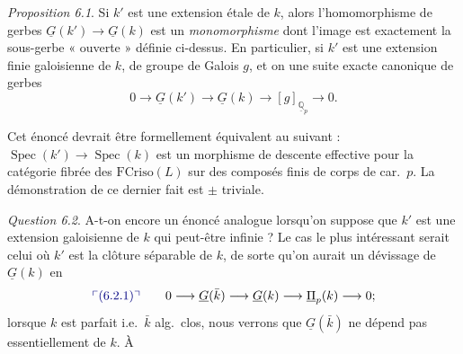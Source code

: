 \documentclass[11pt,a4paper]{article}
\begin{document}
\emph{Proposition 6.1}. Si $k'$ est une extension  étale de
$k$, alors l'homomorphisme de gerbes
$\underline{G}(k') \to \underline{G}(k)$ est un
\emph{monomorphisme} dont l'image est exactement la sous-gerbe
« ouverte » définie ci-dessus. En particulier, si $k'$ est une extension
finie galoisienne de $k$, \struck{\ill{}} de groupe de Galois $g$, et on une
suite exacte canonique de gerbes
\[
0 \longrightarrow \underline{G}(k') \longrightarrow \underline{G}(k)
\longrightarrow [g]_{\underline{\mathbb{Q}}_{p}} \longrightarrow 0 .
\]

Cet énoncé devrait être formellement équivalent au suivant :
$\operatorname{Spec}(k') \to \operatorname{Spec}(k)$ est un morphisme de
descente effective pour la catégorie fibrée des $\mathrm{FCriso}(L)$ sur des
composés finis  de corps de car.\ $p$. La démonstration de ce
dernier fait est $\pm$ triviale.

\emph{Question 6.2}. A-t-on encore un énoncé analogue lorsqu'on suppose
que $k'$ est une extension galoisienne de $k$ qui peut-être infinie ? Le cas
le plus intéressant serait celui où $k'$ est la clôture séparable de $k$, de
sorte qu'on aurait un dévissage de $\underline{G}(k)$ en
\[
\add{(6.2.1)} \qquad 0 \longrightarrow \underline{G}(\bar{k}) \longrightarrow
\underline{G}(k) \longrightarrow \underline{\Pi}_{p}(k) \longrightarrow 0 ;
\]
lorsque $k$ est parfait i.e.\ $\bar{k}$ alg.\ clos, nous verrons que
$\underline{G}(\bar{k})$ ne dépend pas essentiellement de $k$. À
\end{document}
